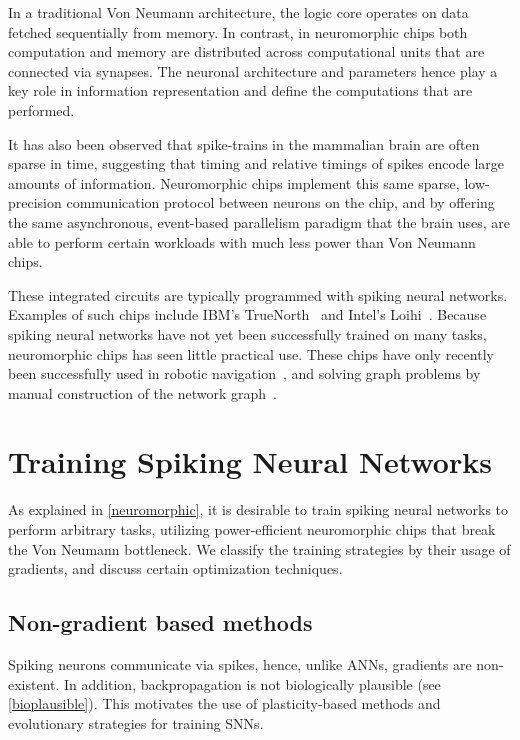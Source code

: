 \documentclass[fyp]{socreport}
\begin{document}
In a traditional Von Neumann architecture, the logic core operates on data
fetched sequentially from memory. In contrast, in neuromorphic chips both
computation and memory are distributed across computational units that are
connected via synapses. The neuronal architecture and parameters hence play a
key role in information representation and define the computations that are
performed.

It has also been observed that spike-trains in the mammalian brain are often
sparse in time, suggesting that timing and relative timings of spikes encode
large amounts of information. Neuromorphic chips implement this same sparse,
low-precision communication protocol between neurons on the chip, and by
offering the same asynchronous, event-based parallelism paradigm that the brain
uses, are able to perform certain workloads with much less power than Von
Neumann chips.

These integrated circuits are typically programmed with spiking neural
networks. Examples of such chips include IBM's TrueNorth~\cite{Merolla668} and
Intel's Loihi~\cite{davies2018loihi}. Because spiking neural networks have not
yet been successfully trained on many tasks, neuromorphic chips has seen little
practical use. These chips have only recently been successfully used in robotic
navigation~\cite{SnnSlam}, and solving graph problems by manual construction of
the network graph~\cite{Severa2016SpikingNA}.

\section{Training Spiking Neural Networks\label{sec:train-spik-neur}}

As explained in \autoref{neuromorphic}, it is desirable to train spiking neural
networks to perform arbitrary tasks, utilizing power-efficient neuromorphic
chips that break the Von Neumann bottleneck. We classify the training strategies
by their usage of gradients, and discuss certain optimization techniques.

\subsection{Non-gradient based methods}

Spiking neurons communicate via spikes, hence, unlike ANNs, gradients are
non-existent. In addition, backpropagation is not biologically plausible (see
\autoref{bioplausible}). This motivates the use of plasticity-based methods and
evolutionary strategies for training SNNs.
\end{document}
